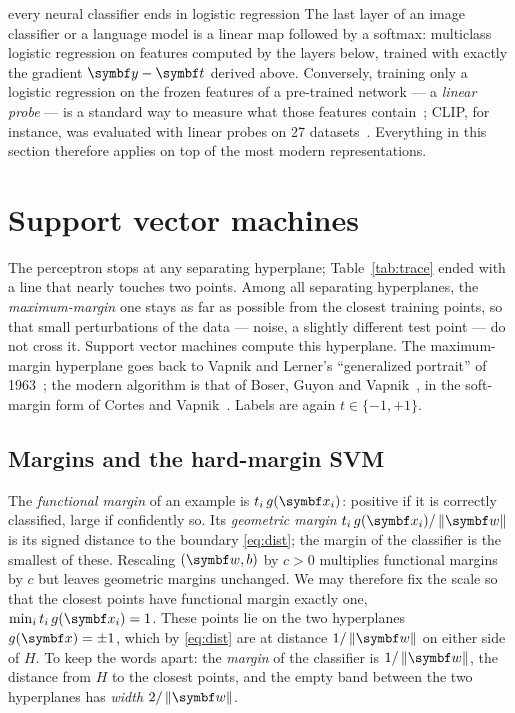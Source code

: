 \documentclass[11pt]{article}
\newcommand{\w}{\vect{w}}
\begin{document}
\begin{modern}{every neural classifier ends in logistic regression}
The last layer of an image classifier or a language model is a linear map followed by a softmax: multiclass logistic
regression on features computed by the layers below, trained with exactly the gradient $\vect{y} - \vect{t}$ derived
above. Conversely, training only a logistic regression on the frozen features of a pre-trained network --- a \emph{linear
probe} --- is a standard way to measure what those features contain~\cite{alain2017}; CLIP, for instance, was evaluated
with linear probes on 27 datasets~\cite{radford2021}. Everything in this section therefore applies on top of the most
modern representations.
\end{modern}

\section{Support vector machines}\label{sec:svm}

The perceptron stops at any separating hyperplane; Table~\ref{tab:trace} ended with a line that nearly touches two
points. Among all separating hyperplanes, the \emph{maximum-margin} one stays as far as possible from the closest training
points, so that small perturbations of the data --- noise, a slightly different test point --- do not cross it. Support
vector machines compute this hyperplane. The maximum-margin hyperplane goes back to Vapnik and
Lerner's ``generalized portrait'' of 1963~\cite{vapnik1963}; the modern algorithm is that of Boser, Guyon and
Vapnik~\cite{boser1992}, in the soft-margin form of Cortes and Vapnik~\cite{cortes1995}. Labels are again $t \in \{-1, +1\}$.

\subsection{Margins and the hard-margin SVM}

The \emph{functional margin} of an example is $t_i\,g(\x_i)$: positive if it is correctly classified, large if
confidently so. Its \emph{geometric margin} $t_i\,g(\x_i)/\norm{\w}$ is its signed distance to the boundary
\eqref{eq:dist}; the margin of the classifier is the smallest of these. Rescaling $(\w, b)$ by $c > 0$ multiplies
functional margins by $c$ but leaves geometric margins unchanged. We may therefore fix the scale so that the closest points have functional margin exactly one,
$\min_i t_i\,g(\x_i) = 1$. These points lie on the two hyperplanes $g(\x) = \pm1$, which by \eqref{eq:dist} are at
distance $1/\norm{\w}$ on either side of $H$. To keep the words apart: the \emph{margin} of the classifier is
$1/\norm{\w}$, the distance from $H$ to the closest points, and the empty band between the two hyperplanes has
\emph{width} $2/\norm{\w}$.
\end{document}
